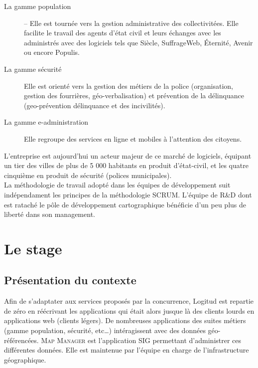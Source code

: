 \documentclass{rapportUHA40}
\begin{document}
\begin{description}
  \item[La gamme population] – Elle est tournée vers la gestion administrative des
    collectivitées. Elle facilite le travail des agents d'état civil et leurs
    échanges avec les administrés avec des logiciels tels que Siècle, SuffrageWeb,
    Éternité, Avenir ou encore Populis.
  \item[La gamme sécurité] Elle est orienté vers la gestion des métiers de la police
    (organisation, gestion des fourrières, géo-verbalisation) et prévention de la
    délinquance (geo-prévention délinquance et des incivilités).
  \item[La gamme e-administration] Elle regroupe des services en ligne et mobiles à
    l'attention des citoyens.
\end{description}


L'entreprise est aujourd’hui un acteur majeur de ce marché de logiciels,
équipant un tier des villes de plus de 5 000 habitants en produit d’état-civil,
et les quatre cinquième en produit de sécurité (polices municipales).\\

La méthodologie de travail adopté dans les équipes de développement suit
indépendament les principes de la méthodologie SCRUM\@. L'équipe de R\&D dont
est rataché le pôle de développement cartographique bénéficie d'un peu plus de
liberté dans son management.

\newpage
\section{Le stage}
\subsection{Présentation du contexte}

Afin de s'adaptater aux services proposés par la concurrence, Logitud est
repartie de zéro en réécrivant les applications qui était alors jusque là des
clients lourds en applications web (clients légers). De nombreuses applications
des suites métiers (gamme population, sécurité, etc\ldots) intéragissent avec
des données géo-référencées. \textsc{Map Manager} est l'application SIG
permettant d’administrer ces différentes données. Elle est maintenue par
l’équipe en charge de l’infrastructure géographique.
\end{document}
